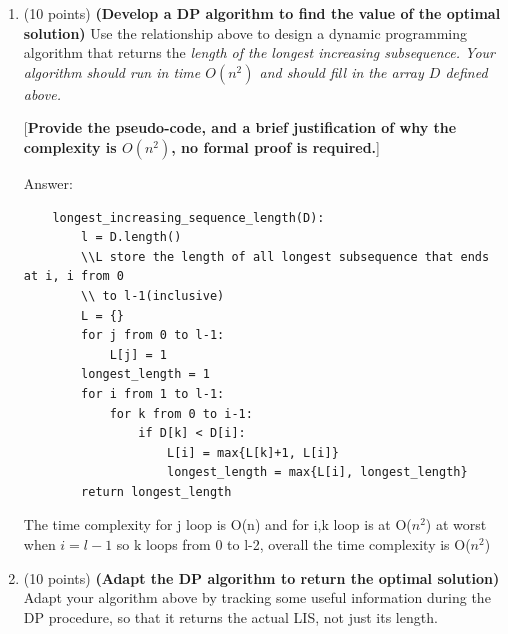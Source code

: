 \documentclass[12pt]{article}
\begin{document}
\begin{enumerate}
\begin{enumerate}
{\color{blue}Answer: \\
when i=0, there is no such k that $0\leq k<i$, so $D[k]=0$ and D[i]=D[k]+1 = 1, i.e. just [A[0]]\\
suppose $0\leq j<i$ and $A[j]<A[i]$ and we have $D[j]=max_{k_{j}}\{D[k_j]+1: 0\leq k_j < j, A[k_j]<A[j]\}$, we will certainly have $D[i] = D[j]+1$ if $D[j]$ is the largest among all $D[k]$
for $0\leq k<i$ and $A[k]<A[i]$. The resulting sequence will be [sequence of A[j], A[i]]. The max\{\} formula basically lists all increasing subsequence that ends at some k that fulfills $0\leq k<i$ and $A[k]<A[i]$ to find out the longest among them and then append A[i] to the sequence.
So the result should indeed be the longest increasing subsequence that ends at i. 
}

[\textbf{Provide a short informal explanation. It is good practice to write a formal proof, but this is not required for credit.}]

\item (10 points) \textbf{(Develop a DP algorithm to find the value of the optimal solution)} Use the relationship above to design a dynamic programming algorithm that returns the \em length \em of the longest increasing subsequence.  Your algorithm should run in time $O(n^2)$ and should fill in the array $D$ defined above.

[\textbf{Provide the pseudo-code, and a brief justification of why the complexity is $O(n^2)$, no formal proof is required.}]
   
{\color{blue}Answer:
\begin{verbatim}
    longest_increasing_sequence_length(D):
        l = D.length()
        \\L store the length of all longest subsequence that ends at i, i from 0
        \\ to l-1(inclusive)
        L = {} 
        for j from 0 to l-1:
            L[j] = 1
        longest_length = 1
        for i from 1 to l-1:
            for k from 0 to i-1:
                if D[k] < D[i]:
                    L[i] = max{L[k]+1, L[i]}
                    longest_length = max{L[i], longest_length}
        return longest_length
\end{verbatim}
The time complexity for j loop is O(n) and for i,k loop is at O($n^2$) at worst when $i=l-1$ so k loops from 0 to l-2, overall the time complexity is O($n^2$)}
\item (10 points) \textbf{(Adapt the DP algorithm to return the optimal solution)} Adapt your algorithm above by tracking some useful information during the DP procedure, so that it returns the actual LIS, not just its length.


\end{enumerate}
\end{enumerate}
\end{document}
